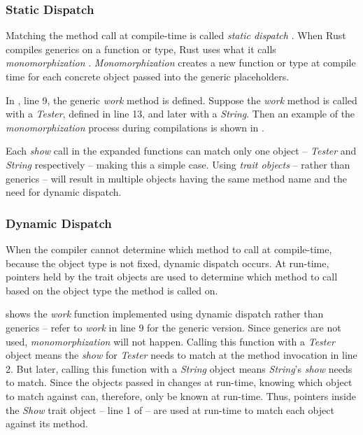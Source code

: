 \subsubsection{Static Dispatch}
Matching the method call at compile-time is called \textit{static dispatch} \cite{klabnik_2019_01, alexandrescu_01_01, abadi_12_01}.
When Rust compiles generics on a function or type, Rust uses what it calls \textit{monomorphization} \cite{klabnik_2019_01}.
\textit{Monomorphization} creates a new function or type at compile time for each concrete object passed into the generic placeholders.

In , line 9, the generic \textit{work} method is defined.
Suppose the \textit{work} method is called with a \textit{Tester}, defined in line 13, and later with a \textit{String}.
Then an example of the \textit{monomorphization} process during compilations is shown in .


Each \textit{show} call in the expanded functions can match only one object -- \textit{Tester} and \textit{String} respectively -- making this a simple case.
Using \textit{trait objects} -- rather than generics -- will result in multiple objects having the same method name and the need for dynamic dispatch.

\subsubsection{Dynamic Dispatch}
When the compiler cannot determine which method to call at compile-time, because the object type is not fixed, dynamic dispatch \cite{alexandrescu_01_01, klabnik_2019_01, abadi_12_01} occurs.
At run-time, pointers held by the trait objects are used to determine which method to call \cite{klabnik_2019_01} based on the object type the method is called on.

 shows the \textit{work} function implemented using dynamic dispatch rather than generics -- refer to \textit{work} in  line 9 for the generic version.
Since generics are not used, \textit{monomorphization} will not happen.
Calling this function with a \textit{Tester} object means the \textit{show} for \textit{Tester} needs to match at the method invocation in line 2.
But later, calling this function with a \textit{String} object means \textit{String}'s \textit{show} needs to match.
Since the objects passed in changes at run-time, knowing which object to match against can, therefore, only be known at run-time.
Thus, pointers inside the \textit{Show} trait object -- line 1 of  -- are used at run-time to match each object against its method.

